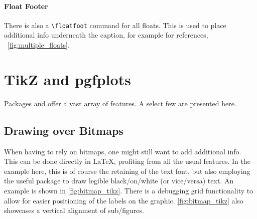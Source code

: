 \paragraph{Float Footer}
There is also a \verb|\floatfoot| command for all floats.
This is used to place additional info underneath the caption, for example for
references, \ \cref{fig:multiple_floats}.

\section{TikZ and pgfplots}
Packages  and  offer a vast array of features.
A select few are presented here.

\subsection{Drawing over Bitmaps}
When having to rely on bitmaps, one might still want to add additional info.
This can be done directly in \LaTeX{}, profiting from all the usual features.
In the example here, this is of course the retaining of the text font, but also
employing the useful  package to draw legible black\-/on\-/white
(or vice\-/versa) text.
An example is shown in \cref{fig:bitmap_tikz}.
There is a debugging grid functionality to allow for easier positioning of the labels
on the graphic.
\cref{fig:bitmap_tikz} also showcases a vertical alignment of sub\-/figures.

